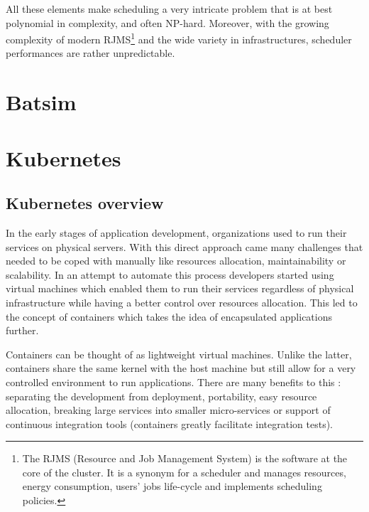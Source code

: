 \documentclass[12pt, a4paper]{memoir}
\newcommand*{\captionsource}[2]{%
    \caption[{#1}]{%
        #1%
        \\\hspace{\linewidth}%
	\textbf{Source:} \textit{#2}%
    }%
}
\begin{document}
All these elements make scheduling a very intricate problem that is at best
polynomial in complexity, and often NP-hard\cite{scheduler-complexity}.
Moreover, with the growing complexity of modern RJMS\footnote{The RJMS
	(Resource and Job Management System) is the software at the core of the
	cluster. It is a synonym for a scheduler and manages resources, energy
	consumption, users' jobs life-cycle and implements scheduling
	policies.} and the wide variety in infrastructures, scheduler
performances are rather unpredictable.

\section{Batsim}

\section{Kubernetes}
\subsection*{Kubernetes overview}
In the early stages of application development, organizations used to run their
services on physical servers. With this direct approach came many challenges
that needed to be coped with manually like resources allocation,
maintainability or scalability. In an attempt to automate this process
developers started using virtual machines which enabled them to run their
services regardless of physical infrastructure while having a better control
over resources allocation.  This led to the concept of containers which takes
the idea of encapsulated applications further.


Containers can be thought of as lightweight virtual machines. Unlike the
latter, containers share the same kernel with the host machine but still allow
for a very controlled environment to run applications. There are many
benefits to this : separating the development from deployment, portability,
easy resource allocation, breaking large services into smaller micro-services
or support of continuous integration tools (containers greatly facilitate
integration tests).\\
\end{document}
